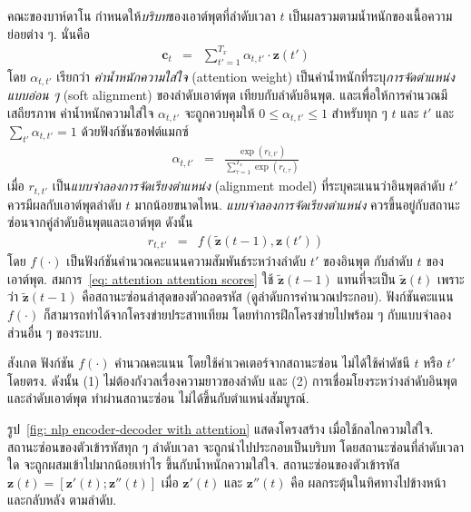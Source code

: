 คณะของบาห์ดาโน\cite{BahdanauEtAl2015}
กำหนดให้\textit{บริบท}ของเอาต์พุตที่ลำดับเวลา $t$
เป็นผลรวมตามน้ำหนักของเนื้อความย่อยต่าง ๆ.
นั่นคือ
\begin{eqnarray}
\bm{c}_t &=& \sum_{t'=1}^{T_x} \alpha_{t,t'} \cdot \bm{z}(t')
\label{eq: attention context}
\end{eqnarray}
โดย $\alpha_{t,t'}$ เรียกว่า \textit{ค่าน้ำหนักความใส่ใจ} (attention weight)
เป็นค่าน้ำหนักที่ระบุ\textit{การจัดตำแหน่งแบบอ่อน ๆ} (soft alignment)
ของลำดับเอาต์พุต เทียบกับลำดับอินพุต.
และเพื่อให้การคำนวณมีเสถียรภาพ 
ค่าน้ำหนักความใส่ใจ $\alpha_{t,t'}$
จะถูกควบคุมให้
$0 \leq \alpha_{t,t'} \leq 1$ 
สำหรับทุก ๆ $t$ และ $t'$
และ $\sum_{t'} \alpha_{t,t'} = 1$ ด้วยฟังก์ชันซอฟต์แมกซ์
\begin{eqnarray}
\alpha_{t,t'} &=& \frac{\exp(r_{t,t'})}{\sum_{\tau=1}^{T_x} \exp(r_{t,\tau})}
\label{eq: attention attention weights}
\end{eqnarray}
เมื่อ $r_{t,t'}$ เป็น\textit{แบบจำลองการจัดเรียงตำแหน่ง} (alignment model)
ที่ระบุคะแนนว่าอินพุตลำดับ $t'$ ควรมีผลกับเอาต์พุตลำดับ $t$ มากน้อยขนาดไหน.
\textit{แบบจำลองการจัดเรียงตำแหน่ง} ควรขึ้นอยู่กับสถานะซ่อนจากคู่ลำดับอินพุตและเอาต์พุต
ดังนั้น
\begin{eqnarray}
r_{t,t'} &=& f(\tilde{\bm{z}}(t-1), \bm{z}(t'))
\label{eq: attention attention scores}
\end{eqnarray}
โดย $f(\cdot)$ เป็นฟังก์ชันคำนวณคะแนนความสัมพันธ์ระหว่างลำดับ $t'$ ของอินพุต
กับลำดับ $t$ ของเอาต์พุต.
สมการ~\ref{eq: attention attention scores} ใช้ $\tilde{\bm{z}}(t-1)$
แทนที่จะเป็น $\tilde{\bm{z}}(t)$
เพราะว่า 
$\tilde{\bm{z}}(t-1)$ คือสถานะซ่อนล่าสุดของตัวถอดรหัส
(ดูลำดับการคำนวณประกอบ).
%
ฟังก์ชันคะแนน $f(\cdot)$ ก็สามารถทำได้จากโครงข่ายประสาทเทียม
โดยทำการฝึกโครงข่ายไปพร้อม ๆ กับแบบจำลองส่วนอื่น ๆ ของระบบ.

สังเกต ฟังก์ชัน $f(\cdot)$ คำนวณคะแนน โดยใช้ค่าเวคเตอร์จากสถานะซ่อน ไม่ได้ใช้ค่าดัชนี $t$ หรือ $t'$ โดยตรง.
ดังนั้น (1) ไม่ต้องกังวลเรื่องความยาวของลำดับ
และ (2) การเชื่อมโยงระหว่างลำดับอินพุต และลำดับเอาต์พุต ทำผ่านสถานะซ่อน
ไม่ได้ขึ้นกับตำแหน่งสัมบูรณ์.

รูป~\ref{fig: nlp encoder-decoder with attention}
แสดงโครงสร้าง เมื่อใช้กลไกความใส่ใจ.
สถานะซ่อนของตัวเข้ารหัสทุก ๆ ลำดับเวลา จะถูกนำไปประกอบเป็นบริบท
โดยสถานะซ่อนที่ลำดับเวลาใด จะถูกผสมเข้าไปมากน้อยเท่าไร ขึ้นกับน้ำหนักความใส่ใจ.
สถานะซ่อนของตัวเข้ารหัส $\bm{z}(t) = [\bm{z}'(t); \bm{z}''(t)]$
เมื่อ $\bm{z}'(t)$ และ $\bm{z}''(t)$ คือ ผลกระตุ้นในทิศทางไปข้างหน้า และกลับหลัง ตามลำดับ.



